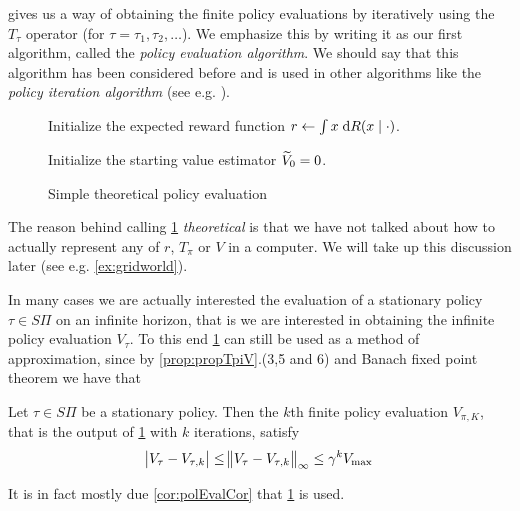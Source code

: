  gives us a way of obtaining the finite policy evaluations
by iteratively using the $T_\tau$ operator (for $\tau=\tau_1, \tau_2, \dots$).
We emphasize this by writing it as our first algorithm,
called the \emph{policy evaluation algorithm}. We should say that this
algorithm has been considered before and is used in other algorithms
like the \emph{policy iteration algorithm} (see e.g. ).

\begin{figure}[H]
  \begin{algorithm}[H]
    \caption{Simple theoretical policy evaluation}
    Initialize the expected reward function
    $r \leftarrow \int x \; \mathrm{d} R(x \mid \cdot)$.

    Initialize the starting value estimator $\widetilde{V}_0 = 0$.


  \label{alg:polEval}
  \end{algorithm}
\end{figure}

The reason behind calling \cref{alg:polEval}
\emph{theoretical} is that we have not
talked about how to actually represent any of $r$, $T_\pi$ or $V$
in a computer. We will take up this discussion later
(see e.g. \cref{ex:gridworld}).

In many cases we are actually interested the evaluation of a stationary
policy $\tau \in S\Pi$ on an infinite horizon, that is we are interested
in obtaining the infinite policy evaluation $V_\tau$.
To this end \cref{alg:polEval} can still be used as a method of approximation,
since by \cref{prop:propTpiV}.(3,5 and 6) and Banach fixed point theorem
we have that

\begin{cor}
  Let $\tau \in S\Pi$ be a stationary policy. Then the
  $k$th finite policy evaluation $V_{\pi, K}$, that is the output of
  \cref{alg:polEval} with $k$ iterations, satisfy
  \[ \abs{V_\tau - V_{\tau, k}} \leq \norm{V_\tau - V_{\tau, k}}_\infty
  \leq \gamma^k V_{\max} \]
  \label{cor:polEvalCor}
\end{cor}

It is in fact mostly due \cref{cor:polEvalCor} that \cref{alg:polEval}
is used.

